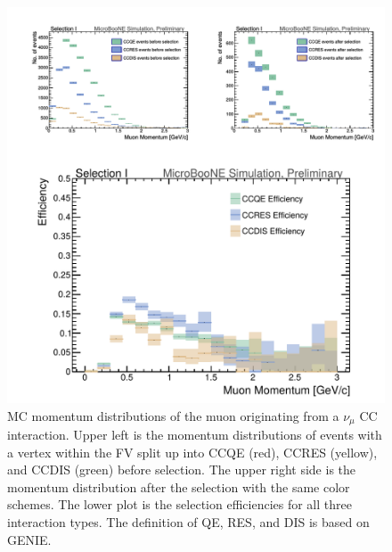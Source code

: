\begin{figure}[htp!]
\includegraphics[width=\textwidth]{figs/truth_stackedmumomentum.png}
\caption{MC momentum distributions of the muon originating from a $\nu_{\mu}$ CC interaction. Upper left is the momentum distributions of events with a vertex within the FV split up into CCQE (red), CCRES (yellow), and CCDIS (green) before selection. The upper right side is the momentum distribution after the selection with the same color schemes. The lower plot is the selection efficiencies for all three interaction types. The definition of QE, RES, and DIS is based on GENIE.}
\label{fig:stacked}
\end{figure}

